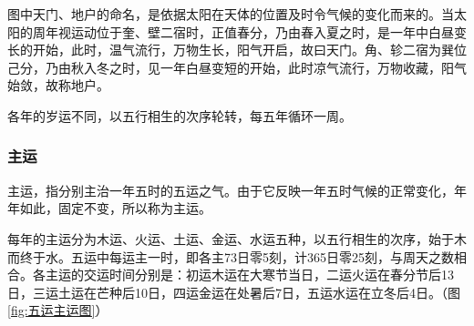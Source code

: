 \documentclass[12pt]{ctexbook}
\begin{document}
图中天门、地户的命名，是依据太阳在天体的位置及时令气候的变化而来的。当太阳的周年视运动位于奎、壁二宿时，正值春分，乃由春入夏之时，是一年中白昼变长的开始，此时，温气流行，万物生长，阳气开启，故曰天门。角、轸二宿为巽位己分，乃由秋入冬之时，见一年白昼变短的开始，此时凉气流行，万物收藏，阳气始敛，故称地户。

各年的岁运不同，以五行相生的次序轮转，每五年循环一周。

\subsubsection{主运}%

主运，指分别主治一年五时的五运之气。由于它反映一年五时气候的正常变化，年年如此，固定不变，所以称为主运。

每年的主运分为木运、火运、土运、金运、水运五种，以五行相生的次序，始于木而终于水。五运中每运主一时，即各主73日零5刻，计365日零25刻，与周天之数相合。各主运的交运时间分别是：初运木运在大寒节当日，二运火运在春分节后13日，三运土运在芒种后10日，四运金运在处暑后7日，五运水运在立冬后4日。（图\ref{fig:五运主运图}）

\end{document}
